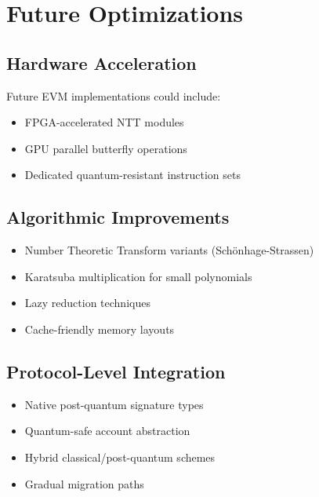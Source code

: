 \section{Future Optimizations}


\subsection{Hardware Acceleration}

Future EVM implementations could include:
\begin{itemize}
\item FPGA-accelerated NTT modules
\item GPU parallel butterfly operations
\item Dedicated quantum-resistant instruction sets
\end{itemize}

\subsection{Algorithmic Improvements}

\begin{itemize}
\item Number Theoretic Transform variants (Sch\"onhage-Strassen)
\item Karatsuba multiplication for small polynomials
\item Lazy reduction techniques
\item Cache-friendly memory layouts
\end{itemize}

\subsection{Protocol-Level Integration}

\begin{itemize}
\item Native post-quantum signature types
\item Quantum-safe account abstraction
\item Hybrid classical/post-quantum schemes
\item Gradual migration paths
\end{itemize}

